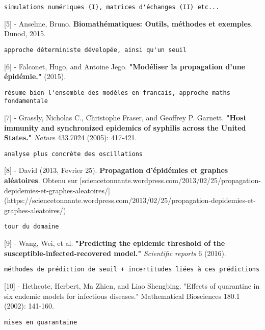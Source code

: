 \documentclass{article}
\begin{document}
\begin{verbatim}
simulations numériques (I), matrices d'échanges (II) etc...
\end{verbatim}


[5] - Anselme, Bruno. \textbf{Biomathématiques: Outils, méthodes et exemples}. Dunod, 2015.


\begin{verbatim}
approche déterministe dévelopée, ainsi qu'un seuil
\end{verbatim}


[6] - Falconet, Hugo, and Antoine Jego. \textbf{"Modéliser la propagation d’une épidémie."} (2015).


\begin{verbatim}
résume bien l'ensemble des modèles en francais, approche maths fondamentale
\end{verbatim}


[7] - Grassly, Nicholas C., Christophe Fraser, and Geoffrey P. Garnett. \textbf{"Host immunity and synchronized epidemics of syphilis across the United States."} \textit{Nature} 433.7024 (2005): 417-421.


\begin{verbatim}
analyse plus concrète des oscillations
\end{verbatim}


[8] - David (2013, Fevrier 25). \textbf{Propagation d'épidémies et graphes aléatoires}. Obtenu sur [sciencetonnante.wordpress.com/2013/02/25/propagation-depidemies-et-graphes-aleatoires/](https://sciencetonnante.wordpress.com/2013/02/25/propagation-depidemies-et-graphes-aleatoires/)


\begin{verbatim}
tour du domaine
\end{verbatim}


[9] - Wang, Wei, et al. \textbf{"Predicting the epidemic threshold of the susceptible-infected-recovered model."} \textit{Scientific reports} 6 (2016).


\begin{verbatim}
méthodes de prédiction de seuil + incertitudes liées à ces prédictions
\end{verbatim}


[10] - Hethcote, Herbert, Ma Zhien, and Liao Shengbing. "Effects of quarantine in six endemic models for infectious diseases." Mathematical Biosciences 180.1 (2002): 141-160.


\begin{verbatim}
mises en quarantaine
\end{verbatim}
\end{document}
